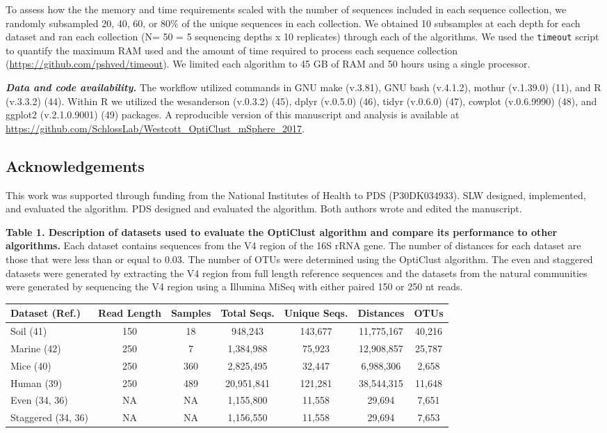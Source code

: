 \documentclass[11pt,]{article}
\begin{document}
To assess how the the memory and time requirements scaled with the
number of sequences included in each sequence collection, we randomly
subsampled 20, 40, 60, or 80\% of the unique sequences in each
collection. We obtained 10 subsamples at each depth for each dataset and
ran each collection (N= 50 = 5 sequencing depths x 10 replicates)
through each of the algorithms. We used the \texttt{timeout} script to
quantify the maximum RAM used and the amount of time required to process
each sequence collection (\url{https://github.com/pshved/timeout}). We
limited each algorithm to 45 GB of RAM and 50 hours using a single
processor.

\textbf{\emph{Data and code availability.}} The workflow utilized
commands in GNU make (v.3.81), GNU bash (v.4.1.2), mothur (v.1.39.0)
(11), and R (v.3.3.2) (44). Within R we utilized the wesanderson
(v.0.3.2) (45), dplyr (v.0.5.0) (46), tidyr (v.0.6.0) (47), cowplot
(v.0.6.9990) (48), and ggplot2 (v.2.1.0.9001) (49) packages. A
reproducible version of this manuscript and analysis is available at
\url{https://github.com/SchlossLab/Westcott_OptiClust_mSphere_2017}.

\subsection{Acknowledgements}\label{acknowledgements}

This work was supported through funding from the National Institutes of
Health to PDS (P30DK034933). SLW designed, implemented, and evaluated
the algorithm. PDS designed and evaluated the algorithm. Both authors
wrote and edited the manuscript.

\newpage

\textbf{Table 1. Description of datasets used to evaluate the OptiClust
algorithm and compare its performance to other algorithms.} Each dataset
contains sequences from the V4 region of the 16S rRNA gene. The number
of distances for each dataset are those that were less than or equal to
0.03. The number of OTUs were determined using the OptiClust algorithm.
The even and staggered datasets were generated by extracting the V4
region from full length reference sequences and the datasets from the
natural communities were generated by sequencing the V4 region using a
Illumina MiSeq with either paired 150 or 250 nt reads.

\begin{longtable}[c]{@{}lcccccc@{}}
\toprule
\textbf{Dataset (Ref.)} & \textbf{Read Length} & \textbf{Samples} &
\textbf{Total Seqs.} & \textbf{Unique Seqs.} & \textbf{Distances} &
\textbf{OTUs}\tabularnewline
\midrule
\endhead
Soil (41) & 150 & 18 & 948,243 & 143,677 & 11,775,167 &
40,216\tabularnewline
Marine (42) & 250 & 7 & 1,384,988 & 75,923 & 12,908,857 &
25,787\tabularnewline
Mice (40) & 250 & 360 & 2,825,495 & 32,447 & 6,988,306 &
2,658\tabularnewline
Human (39) & 250 & 489 & 20,951,841 & 121,281 & 38,544,315 &
11,648\tabularnewline
Even (34, 36) & NA & NA & 1,155,800 & 11,558 & 29,694 &
7,651\tabularnewline
Staggered (34, 36) & NA & NA & 1,156,550 & 11,558 & 29,694 &
7,653\tabularnewline
\bottomrule
\end{longtable}
\end{document}
